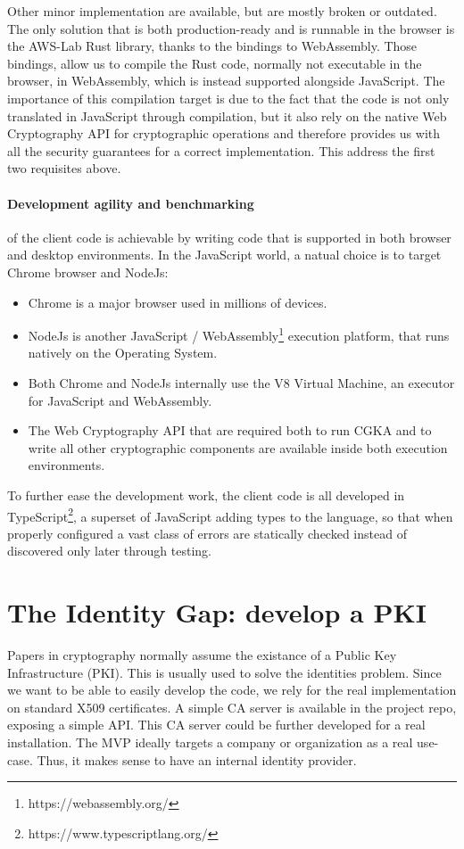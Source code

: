 Other minor implementation are available, but are mostly broken or outdated.
The only solution that is both production-ready and is runnable in the browser is the AWS-Lab Rust library, thanks to the bindings to WebAssembly.
Those bindings, allow us to compile the Rust code, normally not executable in the browser, in WebAssembly, which is instead supported alongside JavaScript.
The importance of this compilation target is due to the fact that the code is not only translated in JavaScript through compilation, but it also rely on the native Web Cryptography API for cryptographic operations and therefore provides us with all the security guarantees for a correct implementation.
This address the first two requisites above.

\paragraph{Development agility and benchmarking} of the client code is achievable by writing code that is supported in both browser and desktop environments.
In the JavaScript world, a natual choice is to target Chrome browser and NodeJs:
\begin{itemize}
    \item Chrome is a major browser used in millions of devices.
    \item NodeJs is another JavaScript / WebAssembly\footnote{https://webassembly.org/} execution platform, that runs natively on the Operating System.
    \item Both Chrome and NodeJs internally use the V8 Virtual Machine, an executor for JavaScript and WebAssembly.
    \item The Web Cryptography API that are required both to run CGKA and to write all other cryptographic components are available inside both execution environments.
\end{itemize}

To further ease the development work, the client code is all developed in TypeScript\footnote{https://www.typescriptlang.org/}, a superset of JavaScript adding types to the language, so that when properly configured a vast class of 
errors are statically checked instead of discovered only later through testing.

\section{The Identity Gap: develop a PKI}

Papers in cryptography normally assume the existance of a Public Key Infrastructure (PKI).
This is usually used to solve the identities problem.
Since we want to be able to easily develop the code, we rely for the real implementation on standard X509 certificates.
A simple CA server is available in the project repo, exposing a simple API. This CA server could be further developed for a real installation.
The MVP ideally targets a company or organization as a real use-case. 
Thus, it makes sense to have an internal identity provider.

